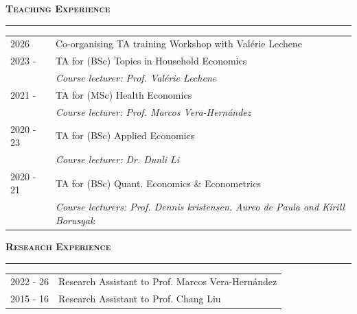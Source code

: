 \documentclass[11pt]{article}
\begin{document}

\noindent\large{\textbf{\textsc{Teaching Experience}}}
\vspace{0.2em}
\hrule 
\normalsize
\noindent \begin{tabular}{ p{2cm} p{13.6cm}}
2026            & Co-organising TA training Workshop with Val\'erie Lechene\\[1em]
2023 -          & TA for (BSc) Topics in Household Economics \\
                & \textit{Course lecturer: Prof. Val\'erie Lechene} \\
2021 -          & TA for (MSc) Health Economics \\
                & \textit{Course lecturer: Prof. Marcos Vera-Hern\'andez} \\
2020 -  23      & TA for (BSc) Applied Economics\\
                & \textit{Course lecturer: Dr. Dunli Li} \\
2020 - 21       & TA for (BSc) Quant. Economics \& Econometrics\\
                & \textit{Course lecturers: Prof. Dennis kristensen, Aureo de Paula and Kirill Borusyak} \\
\end{tabular}
\vspace{0.6em}



\noindent\large{\textbf{\textsc{Research Experience}}}
\vspace{0.2em}
\hrule 
\normalsize
\noindent \begin{tabular}{ p{2cm} p{13.6cm}}
2022 - 26         & Research Assistant to Prof. Marcos Vera-Hern\'andez \\
2015 - 16     & Research Assistant to Prof. Chang Liu\\
\end{tabular}
\vspace{0.6em}
\end{document}
